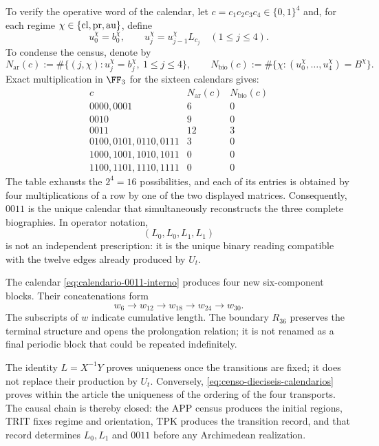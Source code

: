 To verify the operative word of the calendar, let
\(c=c_1c_2c_3c_4\in\{0,1\}^4\) and, for each regime
\(\chi\in\{{\rm cl},{\rm pr},{\rm au}\}\), define
\[
 u_0^\chi=b_0^\chi,\qquad
 u_j^\chi=u_{j-1}^\chi L_{c_j}\quad(1\le j\le4).
\]
To condense the census, denote by
\[
 N_{\mathrm{ar}}(c):=
 \#\{(j,\chi):u_j^\chi=b_j^\chi,\ 1\le j\le4\},\qquad
 N_{\mathrm{bio}}(c):=
 \#\{\chi:(u_0^\chi,\ldots,u_4^\chi)=B^\chi\}.
\]
Exact multiplication in \(\FF_3\) for the sixteen calendars gives:
\[
\begin{array}{c|c|c}
 c&N_{\mathrm{ar}}(c)&N_{\mathrm{bio}}(c)\\ \hline
0000,0001&6&0\\
0010&9&0\\
0011&12&3\\
0100,0101,0110,0111&3&0\\
1000,1001,1010,1011&0&0\\
1100,1101,1110,1111&0&0
\end{array}
\tag{D}
\label{eq:censo-dieciseis-calendarios}
\]
The table exhausts the \(2^4=16\) possibilities, and each of its entries is
obtained by four multiplications of a row by one of the two displayed matrices.
Consequently, \(0011\) is the unique calendar that simultaneously reconstructs
the three complete biographies. In operator notation,
\begin{equation}
 (L_0,L_0,L_1,L_1)
 \label{eq:calendario-0011-interno}
\end{equation}
is not an independent prescription: it is the unique binary reading compatible
with the twelve edges already produced by \(U_t\).

The calendar \eqref{eq:calendario-0011-interno} produces four new
six-component blocks. Their concatenations form
\[
 w_6\longrightarrow w_{12}\longrightarrow w_{18}
 \longrightarrow w_{24}\longrightarrow w_{30}.
\]
The subscripts of \(w\) indicate cumulative length. The boundary \(R_{36}\) preserves the terminal structure and opens the prolongation relation; it is not renamed as a final periodic block that could be repeated indefinitely.

The identity \(L=X^{-1}Y\) proves uniqueness once the transitions are
fixed; it does not replace their production by \(U_t\). Conversely,
\eqref{eq:censo-dieciseis-calendarios} proves within the article the uniqueness
of the ordering of the four transports. The causal chain is thereby closed:
the APP census produces the initial regions, TRIT fixes regime and
orientation, TPK produces the transition record, and that record
determines \(L_0,L_1\) and \(0011\) before any Archimedean realization.

